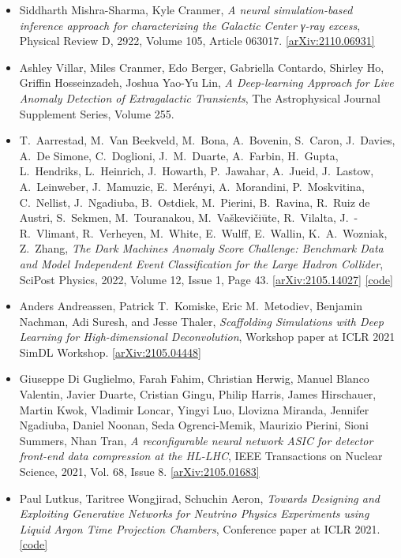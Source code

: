 \begin{itemize}
\item Siddharth Mishra-Sharma, Kyle Cranmer, \textit{A neural simulation-based inference approach for characterizing the Galactic Center γ-ray excess}, Physical Review D, 2922, Volume 105, Article 063017. \href{https://arxiv.org/abs/2110.06931}{[arXiv:2110.06931]} 
\item Ashley Villar, Miles Cranmer, Edo Berger, Gabriella Contardo, Shirley Ho, Griffin Hosseinzadeh, Joshua Yao-Yu Lin, \textit{A Deep-learning Approach for Live Anomaly Detection of Extragalactic Transients}, The Astrophysical Journal Supplement Series, Volume 255. 
\item T.\  Aarrestad, M.\  Van Beekveld, M.\  Bona, A.\  Bovenin, S.\  Caron, J.\  Davies, A.\  De Simone, C.\  Doglioni, J.\ M.\  Duarte, A.\  Farbin, H.\  Gupta, L.\  Hendriks, L.\  Heinrich, J.\  Howarth, P.\  Jawahar, A.\  Jueid, J.\  Lastow, A.\  Leinweber, J.\  Mamuzic, E.\  Merényi, A.\  Morandini, P.\  Moskvitina, C.\  Nellist, J.\  Ngadiuba, B.\  Ostdiek, M.\  Pierini, B.\  Ravina, R.\  Ruiz de Austri, S.\  Sekmen, M.\  Touranakou, M.\  Vaškevičiūte, R.\  Vilalta, J.\ -R.\  Vlimant, R.\  Verheyen, M.\  White, E.\  Wulff, E.\  Wallin, K.\ A.\  Wozniak, Z.\  Zhang, \textit{The Dark Machines Anomaly Score Challenge: Benchmark Data and Model Independent Event Classification for the Large Hadron Collider}, SciPost Physics, 2022, Volume 12, Issue 1, Page 43. \href{https://arxiv.org/abs/2105.14027}{[arXiv:2105.14027]}  \href{https://github.com/bostdiek/DarkMachines-UnsupervisedChallenge}{[code]} 
\item Anders Andreassen, Patrick T.\  Komiske, Eric M.\  Metodiev, Benjamin Nachman, Adi Suresh, and Jesse Thaler, \textit{Scaffolding Simulations with Deep Learning for High-dimensional Deconvolution}, Workshop paper at ICLR 2021 SimDL Workshop. \href{https://arxiv.org/abs/2105.04448}{[arXiv:2105.04448]} 
\item Giuseppe Di Guglielmo, Farah Fahim, Christian Herwig, Manuel Blanco Valentin, Javier Duarte, Cristian Gingu, Philip Harris, James Hirschauer, Martin Kwok, Vladimir Loncar, Yingyi Luo, Llovizna Miranda, Jennifer Ngadiuba, Daniel Noonan, Seda Ogrenci-Memik, Maurizio Pierini, Sioni Summers, Nhan Tran, \textit{A reconfigurable neural network ASIC for detector front-end data compression at the HL-LHC}, IEEE Transactions on Nuclear Science, 2021, Vol. 68, Issue 8. \href{https://arxiv.org/abs/2105.01683}{[arXiv:2105.01683]} 
\item Paul Lutkus, Taritree Wongjirad, Schuchin Aeron, \textit{Towards Designing and Exploiting Generative Networks for Neutrino Physics Experiments using Liquid Argon Time Projection Chambers}, Conference paper at ICLR 2021.  \href{https://github.com/NuTufts/LArTPC-VQVAE}{[code]} 

\end{itemize}
